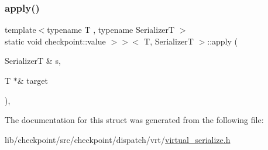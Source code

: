 \subsubsection{\texorpdfstring{apply()}{apply()}}
{\footnotesize\ttfamily template$<$typename T , typename SerializerT $>$ \\
static void checkpoint\+::value $>$$>$$<$ T, SerializerT $>$\+::apply (\begin{DoxyParamCaption}\item[{SerializerT \&}]{s,  }\item[{T $\ast$\&}]{target }\end{DoxyParamCaption})\hspace{0.3cm}{\ttfamily [inline]}, {\ttfamily [static]}}



The documentation for this struct was generated from the following file\+:\begin{DoxyCompactItemize}
\item 
lib/checkpoint/src/checkpoint/dispatch/vrt/\hyperlink{virtual__serialize_8h}{virtual\+\_\+serialize.\+h}\end{DoxyCompactItemize}
